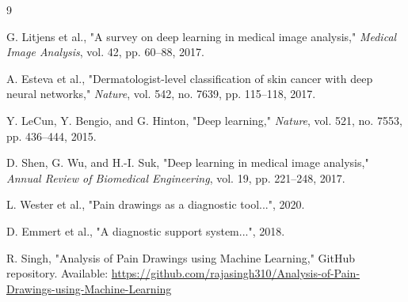 \documentclass[12pt]{report}
\begin{document}
\begin{thebibliography}{9}

    G. Litjens et al., "A survey on deep learning in medical image analysis," \textit{Medical Image Analysis}, vol. 42, pp. 60--88, 2017.

    A. Esteva et al., "Dermatologist-level classification of skin cancer with deep neural networks," \textit{Nature}, vol. 542, no. 7639, pp. 115--118, 2017.

    Y. LeCun, Y. Bengio, and G. Hinton, "Deep learning," \textit{Nature}, vol. 521, no. 7553, pp. 436--444, 2015.

    D. Shen, G. Wu, and H.-I. Suk, "Deep learning in medical image analysis," \textit{Annual Review of Biomedical Engineering}, vol. 19, pp. 221--248, 2017.

    L. Wester et al., "Pain drawings as a diagnostic tool...", 2020.

    D. Emmert et al., "A diagnostic support system...", 2018.

    R. Singh, "Analysis of Pain Drawings using Machine Learning," GitHub repository. Available: \url{https://github.com/rajasingh310/Analysis-of-Pain-Drawings-using-Machine-Learning}

\end{thebibliography}
\end{document}
